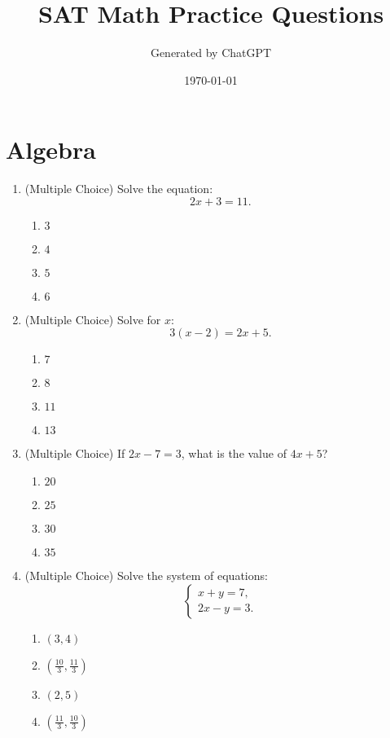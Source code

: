 \documentclass[12pt]{article}
\begin{document}
\title{SAT Math Practice Questions}
\author{Generated by ChatGPT}
\date{\today}
\maketitle
\tableofcontents
\newpage

\section{Algebra}
\begin{enumerate}[label=\textbf{Question \arabic*:}]
  \item (Multiple Choice) Solve the equation:
    \[
    2x + 3 = 11.
    \]
    \begin{enumerate}[label=(\Alph*)]
      \item $3$
      \item $4$
      \item $5$
      \item $6$
    \end{enumerate}
    
  \item (Multiple Choice) Solve for \( x \):
    \[
    3(x - 2) = 2x + 5.
    \]
    \begin{enumerate}[label=(\Alph*)]
      \item \(7\)
      \item \(8\)
      \item \(11\)
      \item \(13\)
    \end{enumerate}
    
  \item (Multiple Choice) If \( 2x - 7 = 3 \), what is the value of \( 4x + 5 \)?
    \begin{enumerate}[label=(\Alph*)]
      \item \(20\)
      \item \(25\)
      \item \(30\)
      \item \(35\)
    \end{enumerate}
    
  \item (Multiple Choice) Solve the system of equations:
    \[
    \begin{cases}
      x + y = 7, \\
      2x - y = 3.
    \end{cases}
    \]
    \begin{enumerate}[label=(\Alph*)]
      \item \((3, 4)\)
      \item \(\left(\frac{10}{3}, \frac{11}{3}\right)\)
      \item \((2, 5)\)
      \item \(\left(\frac{11}{3}, \frac{10}{3}\right)\)
    \end{enumerate}
    

\end{enumerate}
\end{document}
